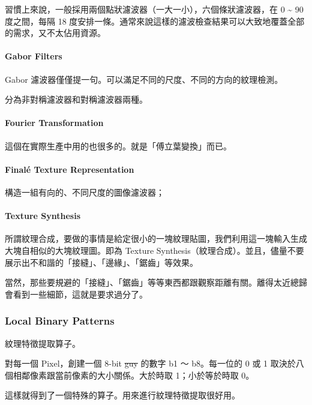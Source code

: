 \documentclass[
]{article}
\begin{document}
習慣上來說，一般採用兩個點狀濾波器（一大一小），六個條狀濾波器，在 0
\textasciitilde{} 90 度之間，每隔 18
度安排一條。通常來說這樣的濾波檢查結果可以大致地覆蓋全部的需求，又不太佔用資源。

\hypertarget{header-n38}{%
\paragraph{Gabor Filters}\label{header-n38}}

Gabor 濾波器僅僅提一句。可以滿足不同的尺度、不同的方向的紋理檢測。

分為非對稱濾波器和對稱濾波器兩種。

\hypertarget{header-n41}{%
\paragraph{Fourier Transformation}\label{header-n41}}

這個在實際生產中用的也很多的。就是「傅立葉變換」而已。

\hypertarget{header-n43}{%
\paragraph{Finalé Texture Representation}\label{header-n43}}

構造一組有向的、不同尺度的圖像濾波器；

\hypertarget{header-n45}{%
\paragraph{Texture Synthesis}\label{header-n45}}

所謂紋理合成，要做的事情是給定很小的一塊紋理貼圖，我們利用這一塊輸入生成大塊自相似的大塊紋理圖。即為
Texture
Synthesis（紋理合成）。並且，儘量不要展示出不和諧的「接縫」、「邊緣」、「鋸齒」等效果。

當然，那些要規避的「接縫」、「鋸齒」等等東西都跟觀察距離有關。離得太近總歸會看到一些細節，這就是要求過分了。

\hypertarget{header-n48}{%
\subsubsection{Local Binary Patterns}\label{header-n48}}

紋理特徵提取算子。

對每一個 Pixel，創建一個 8-bit \sout{guy} 的數字 b1 ～ b8。每一位的 0 或
1 取決於八個相鄰像素跟當前像素的大小關係。大於時取 1；小於等於時取 0。

這樣就得到了一個特殊的算子。用來進行紋理特徵提取很好用。
\end{document}
